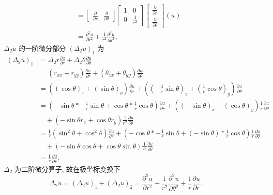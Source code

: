 \documentclass[\ROOT/main.tex]{subfiles}
\begin{document}
\begin{align*}
    &=
    \begin{bmatrix}
        \frac{\partial}{\partial r} & \frac{\partial}{\partial \theta}
    \end{bmatrix}
    \begin{bmatrix}
        1 & 0 \\
        0 & \frac{1}{r^2}
    \end{bmatrix}
    \begin{bmatrix}
        \frac{\partial}{\partial r} \\
        \frac{\partial}{\partial \theta}
    \end{bmatrix}
    \left( u \right) \\
    &= \frac{\partial^2 u}{\partial r^2} + \frac{1}{r^2} \frac{\partial^2 u}{\partial \theta^2}
    ,
\end{align*}
$\Delta_2 u$ 的一阶微分部分 $\left( \Delta_2 u \right)_1$ 为
\begin{align*}
    \left( \Delta_2 u \right)_1
    &= \Delta_2 r \frac{\partial u}{\partial r} + \Delta_2 \theta \frac{\partial u}{\partial \theta} \\
    &= \left( r_{xx} + r_{yy} \right) \frac{\partial u}{\partial r} + \left( \theta_{xx} + \theta_{yy} \right) \frac{\partial u}{\partial \theta} \\
    &= \left(
        \left( \cos \theta \right)_x + \left( \sin \theta \right)_y
    \right) \frac{\partial u}{\partial r}
    + \left(
        \left( - \frac{1}{r} \sin \theta \right)_x + \left( \frac{1}{r} \cos \theta \right)_y
    \right) \frac{\partial u}{\partial \theta} \\
    &= \left( 
        - \sin \theta * - \frac{1}{r} \sin \theta + \cos \theta * \frac{1}{r} \cos \theta
    \right) \frac{\partial u}{\partial r} + 
    \left( 
            \left( - \sin \theta \right)_x + \left( \cos \theta \right)_y
    \right) \frac{1}{r} \frac{\partial u}{\partial \theta} \\
    &\quad + \left( 
            - \sin \theta r_x + \cos \theta r_y
    \right) \frac{1}{r^2} \frac{\partial u}{\partial \theta} \\
    &=
    \frac{1}{r} \left( \sin^2 \theta + \cos^2 \theta \right) \frac{\partial u}{\partial r}  +
    \left( 
            - \cos \theta * - \frac{1}{r} \sin \theta + \left( - \sin \theta \right)  * \frac{1}{r} \cos \theta
    \right) \frac{1}{r} \frac{\partial u}{\partial \theta} \\
    &\quad + \left( 
            - \sin \theta \cos \theta + \cos \theta \sin \theta
    \right) \frac{1}{r^2} \frac{\partial u}{\partial \theta} \\
    &= \frac{1}{r} \frac{\partial u}{\partial r}
    ,
\end{align*}
$\Delta_2$ 为二阶微分算子, 故在极坐标变换下
\[
    \Delta_2 u
    = \left( \Delta_2 u \right)_1 + \left( \Delta_2 u \right)_2
    = \frac{\partial^2 u}{\partial r^2} + \frac{1}{r^2} \frac{\partial^2 u}{\partial \theta^2} + \frac{1}{r} \frac{\partial u}{\partial r}.
\]
\end{document}
